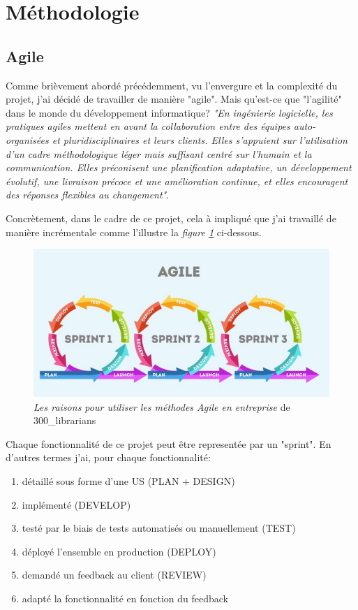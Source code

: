 \section{Méthodologie}
\subsection{Agile}

Comme brièvement abordé précédemment, vu l'envergure et la complexité du projet, j'ai décidé de travailler de manière "agile". Mais qu'est-ce que "l'agilité" dans le monde du développement informatique? \textit{"En ingénierie logicielle, les pratiques agiles mettent en avant la collaboration entre des équipes auto-organisées et pluridisciplinaires et leurs clients. Elles s'appuient sur l'utilisation d'un cadre méthodologique léger mais suffisant centré sur l'humain et la communication. Elles préconisent une planification adaptative, un développement évolutif, une livraison précoce et une amélioration continue, et elles encouragent des réponses flexibles au changement"\cite{Agile}}.

\newpara

Concrètement, dans le cadre de ce projet, cela à impliqué que j'ai travaillé de manière incrémentale comme l'illustre la \textit{figure \ref{agile}} ci-dessous. 
\begin{figure}[H]
  \centering
  \includegraphics[width=0.75\linewidth]{img/agile.jpeg}
  \caption{ \textit{Les raisons pour utiliser les méthodes Agile en entreprise} de 300\_librarians}
  \label{agile}
\end{figure}
Chaque fonctionnalité de ce projet peut être representée par un "sprint". En d'autres termes j'ai, pour chaque fonctionnalité: 
\begin{enumerate}
  \item détaillé sous forme d'une US (PLAN + DESIGN) 
  \item implémenté (DEVELOP)
  \item testé par le biais de tests automatisés ou manuellement (TEST)
  \item déployé l'ensemble en production (DEPLOY)
  \item demandé un feedback au client (REVIEW)
  \item adapté la fonctionnalité en fonction du feedback 
\end{enumerate} 

